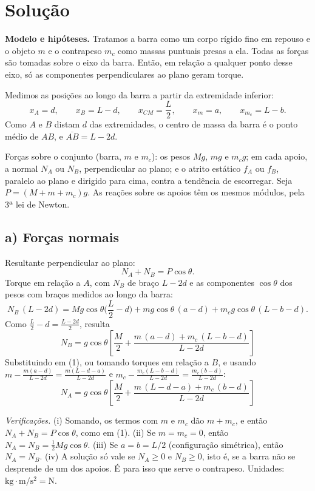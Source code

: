 \documentclass{article}%
\begin{document}
\section*{Solução}

\textbf{Modelo e hipóteses.} Tratamos a barra como um corpo rígido fino em repouso e o objeto $m$ e o contrapeso $m_c$ como massas puntuais presas a ela. Todas as forças são tomadas sobre o eixo da barra. Então, em relação a qualquer ponto desse eixo, só as componentes perpendiculares ao plano geram torque.

Medimos as posições ao longo da barra a partir da extremidade inferior:
\[
x_A=d,\qquad x_B=L-d,\qquad x_{CM}=\frac L2,\qquad x_m=a,\qquad x_{m_c}=L-b .
\]
Como $A$ e $B$ distam $d$ das extremidades, o centro de massa da barra é o ponto médio de $AB$, e $\overline{AB}=L-2d$.

Forças sobre o conjunto (barra, $m$ e $m_c$): os pesos $Mg$, $mg$ e $m_cg$; em cada apoio, a normal $N_{A}$ ou $N_{B}$, perpendicular ao plano; e o atrito estático $f_{A}$ ou $f_{B}$, paralelo ao plano e dirigido para cima, contra a tendência de escorregar. Seja $P=(M+m+m_c)g$. As reações sobre os apoios têm os mesmos módulos, pela 3ª lei de Newton.

\subsection*{a) Forças normais}

Resultante perpendicular ao plano:
\[
N_A+N_B=P\cos\theta. \tag{1}
\]
Torque em relação a $A$, com $N_B$ de braço $L-2d$ e as componentes $\cos\theta$ dos pesos com braços medidos ao longo da barra:
\[
N_B\,(L-2d)=Mg\cos\theta\Big(\frac L2-d\Big)+mg\cos\theta\,(a-d)+m_cg\cos\theta\,(L-b-d).
\]
Como $\frac L2-d=\frac{L-2d}{2}$, resulta
\[
\boxed{N_B=g\cos\theta\left[\frac M2+\frac{m\,(a-d)+m_c\,(L-b-d)}{L-2d}\right]}
\]
Substituindo em (1), ou tomando torques em relação a $B$, e usando $m-\frac{m(a-d)}{L-2d}=\frac{m(L-d-a)}{L-2d}$ e $m_c-\frac{m_c(L-b-d)}{L-2d}=\frac{m_c(b-d)}{L-2d}$:
\[
\boxed{N_A=g\cos\theta\left[\frac M2+\frac{m\,(L-d-a)+m_c\,(b-d)}{L-2d}\right]}
\]

\textit{Verificações.} (i) Somando, os termos com $m$ e $m_c$ dão $m+m_c$, e então $N_A+N_B=P\cos\theta$, como em (1). (ii) Se $m=m_c=0$, então $N_A=N_B=\tfrac12Mg\cos\theta$. (iii) Se $a=b=L/2$ (configuração simétrica), então $N_A=N_B$. (iv) A solução só vale se $N_A\ge 0$ e $N_B\ge 0$, isto é, se a barra não se desprende de um dos apoios. É para isso que serve o contrapeso. Unidades: $\mathrm{kg\cdot m/s^2}=\mathrm N$.
\end{document}
